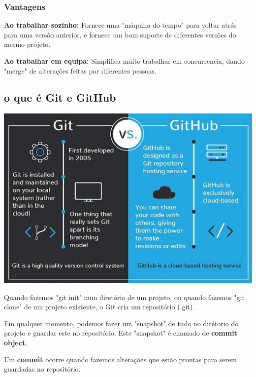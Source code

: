 \documentclass{article}
\begin{document}
\subsubsection{Vantagens}

\begin{flushleft}
  \textbf{Ao trabalhar sozinho:} Fornece uma "máquina do tempo" para
  voltar atrás para uma versão anterior, e fornece um bom suporte 
  de diferentes versões do mesmo projeto.

  \vspace{2mm}

  \textbf{Ao trabalhar em equipa:} Simplifica muito trabalhar em concurrencia,
  dando "merge" de alterações feitas por diferentes pessoas.
\end{flushleft}

\subsection{o que é Git e GitHub}

\begin{center}
  \includegraphics[scale=0.5]{4}
\end{center}

Quando fazemos "git init" num diretório de um projeto, ou quando fazemos
"git clone" de um projeto existente, o Git cria um repositório (.git).

Em qualquer momento, podemos fazer um "snapshot" de tudo
no dirétorio do projeto e guardar este no repositório.
Este "snapshot" é chamado de \textbf{commit object}.

\pagebreak

Um \textbf{commit} ocorre quando fazemos alterações que estão
prontas para serem guardadas no repositório.
\end{document}
